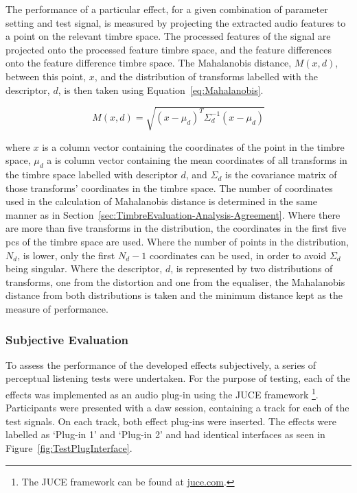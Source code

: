 			The performance of a particular effect, for a given combination of parameter setting and test
			signal, is measured by projecting the extracted audio features to a point on the relevant timbre
			space. The processed features of the signal are projected onto the processed feature timbre space,
			and the feature differences onto the feature difference timbre space. The Mahalanobis distance,
			$M(x, d)$, between this point, $x$, and the distribution of transforms labelled with the
			descriptor, $d$, is then taken using Equation~\ref{eq:Mahalanobis}.
			
			\begin{equation}
				M(x, d) = \sqrt{(x - \mu_{d})^{T}\Sigma_{d}^{-1}(x - \mu_{d})}
				\label{eq:Mahalanobis}
			\end{equation}

			where $x$ is a column vector containing the coordinates of the point in the timbre space, $\mu_{d}$
			a is column vector containing the mean coordinates of all transforms in the timbre space labelled
			with descriptor $d$, and $\Sigma_{d}$ is the covariance matrix of those transforms' coordinates in
			the timbre space. The number of coordinates used in the calculation of Mahalanobis distance is
			determined in the same manner as in Section~\ref{sec:TimbreEvaluation-Analysis-Agreement}. Where
			there are more than five transforms in the distribution, the coordinates in the first five
			\acrshort{pc}s of the timbre space are used. Where the number of points in the distribution,
			$N_{d}$, is lower, only the first $N_{d} - 1$ coordinates can be used, in order to avoid
			$\Sigma_{d}$ being singular. Where the descriptor, $d$, is represented by two distributions of
			transforms, one from the distortion and one from the equaliser, the Mahalanobis distance from both
			distributions is taken and the minimum distance kept as the measure of performance.
	
		\subsubsection*{Subjective Evaluation}
			To assess the performance of the developed effects subjectively, a series of perceptual listening
			tests were undertaken. For the purpose of testing, each of the effects was implemented as an audio
			plug-in using the JUCE framework \footnote{The JUCE framework can be found at
			\href{https://juce.com}{juce.com}.}. Participants were presented with a \acrshort{daw} session,
			containing a track for each of the test signals. On each track, both effect plug-ins were inserted.
			The effects were labelled as `Plug-in 1' and `Plug-in 2' and had identical interfaces as seen
			in Figure~\ref{fig:TestPlugInterface}.

